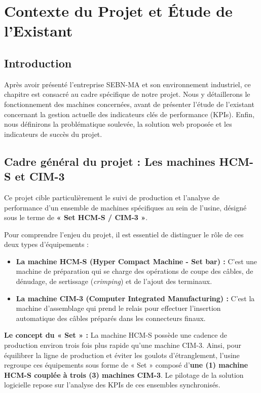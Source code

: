 \chapter{Contexte du Projet et Étude de l'Existant}
\label{chap:contexte_projet}

\section*{Introduction}
Après avoir présenté l'entreprise SEBN-MA et son environnement industriel, ce chapitre est consacré au cadre spécifique de notre projet. Nous y détaillerons le fonctionnement des machines concernées, avant de présenter l'étude de l'existant concernant la gestion actuelle des indicateurs clés de performance (KPIs). Enfin, nous définirons la problématique soulevée, la solution web proposée et les indicateurs de succès du projet.

\section{Cadre général du projet : Les machines HCM-S et CIM-3}
Ce projet cible particulièrement le suivi de production et l'analyse de performance d'un ensemble de machines spécifiques au sein de l'usine, désigné sous le terme de \textbf{« Set HCM-S / CIM-3 »}.

Pour comprendre l'enjeu du projet, il est essentiel de distinguer le rôle de ces deux types d'équipements :
\begin{itemize}
    \item \textbf{La machine HCM-S (Hyper Compact Machine - Set bar) :} C'est une machine de préparation qui se charge des opérations de coupe des câbles, de dénudage, de sertissage (\textit{crimping}) et de l'ajout des terminaux.
    \item \textbf{La machine CIM-3 (Computer Integrated Manufacturing) :} C'est la machine d'assemblage qui prend le relais pour effectuer l'insertion automatique des câbles préparés dans les connecteurs finaux.
\end{itemize}

\textbf{Le concept du « Set » :} La machine HCM-S possède une cadence de production environ trois fois plus rapide qu'une machine CIM-3. Ainsi, pour équilibrer la ligne de production et éviter les goulots d'étranglement, l'usine regroupe ces équipements sous forme de « Set » composé d'\textbf{une (1) machine HCM-S couplée à trois (3) machines CIM-3}. Le pilotage de la solution logicielle repose sur l'analyse des KPIs de ces ensembles synchronisés.

